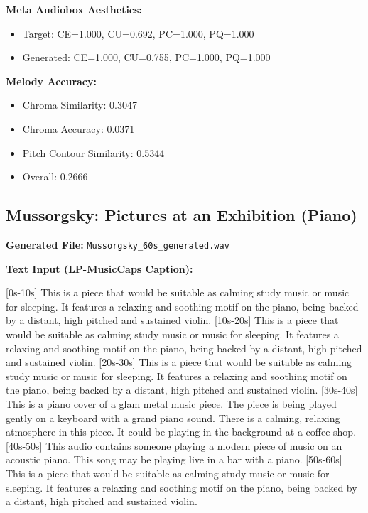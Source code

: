 \documentclass{article}
\begin{document}
\textbf{Meta Audiobox Aesthetics:}
\begin{itemize}
    \item Target: CE=1.000, CU=0.692, PC=1.000, PQ=1.000
    \item Generated: CE=1.000, CU=0.755, PC=1.000, PQ=1.000
\end{itemize}

\textbf{Melody Accuracy:}
\begin{itemize}
    \item Chroma Similarity: 0.3047
    \item Chroma Accuracy: 0.0371
    \item Pitch Contour Similarity: 0.5344
    \item Overall: 0.2666
\end{itemize}

\subsection{Mussorgsky: Pictures at an Exhibition (Piano)}

\textbf{Generated File:} \texttt{Mussorgsky\_60s\_generated.wav}

\textbf{Text Input (LP-MusicCaps Caption):}

\small
[0s-10s] This is a piece that would be suitable as calming study music or music for sleeping. It features a relaxing and soothing motif on the piano, being backed by a distant, high pitched and sustained violin. [10s-20s] This is a piece that would be suitable as calming study music or music for sleeping. It features a relaxing and soothing motif on the piano, being backed by a distant, high pitched and sustained violin. [20s-30s] This is a piece that would be suitable as calming study music or music for sleeping. It features a relaxing and soothing motif on the piano, being backed by a distant, high pitched and sustained violin. [30s-40s] This is a piano cover of a glam metal music piece. The piece is being played gently on a keyboard with a grand piano sound. There is a calming, relaxing atmosphere in this piece. It could be playing in the background at a coffee shop. [40s-50s] This audio contains someone playing a modern piece of music on an acoustic piano. This song may be playing live in a bar with a piano. [50s-60s] This is a piece that would be suitable as calming study music or music for sleeping. It features a relaxing and soothing motif on the piano, being backed by a distant, high pitched and sustained violin.
\normalsize
\end{document}
